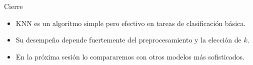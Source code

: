 \documentclass{beamer}
\begin{document}
\begin{frame}{Cierre}
\begin{itemize}
    \item KNN es un algoritmo simple pero efectivo en tareas de clasificación básica.
    \item Su desempeño depende fuertemente del preprocesamiento y la elección de $k$.
    \item En la próxima sesión lo compararemos con otros modelos más sofisticados.
\end{itemize}
\end{frame}
\end{document}
